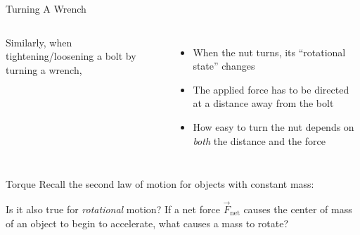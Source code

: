 \documentclass[12pt,compress,aspectratio=169]{beamer}
\begin{document}
\begin{frame}{Turning A Wrench}
  \begin{columns}
    
    Similarly, when tightening/loosening a bolt by turning a wrench,
    \begin{itemize}
    \item When the nut turns, its ``rotational state'' changes
    \item The applied force has to be directed at a distance away from the
      bolt
    \item How easy to turn the nut depends on \emph{both} the distance and the
      force
    \end{itemize}
  \end{columns}
\end{frame}



\begin{frame}{Torque}
  Recall the second law of motion for objects with constant mass:
    

  \vspace{-.1in}Is it also true for \emph{rotational} motion? If a net force
  $\vec F_\text{net}$ causes the center of mass of an object to begin to
  accelerate, what causes a mass to rotate?
\end{frame}



%
\end{document}
